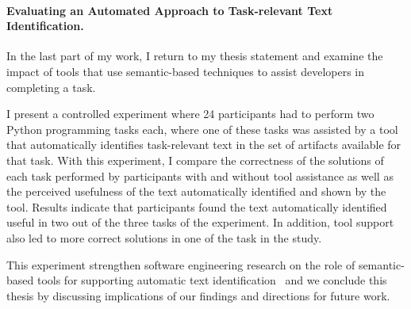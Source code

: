 \paragraph{\textbf{Evaluating an Automated Approach to Task-relevant Text Identification.}} 




In the last part of my work, I return to my thesis statement
and examine the impact of tools that use semantic-based techniques to assist developers in 
completing a task. 



I present a controlled experiment where 24 participants had to 
perform two Python programming tasks each, where one of these tasks 
was assisted by a tool that automatically identifies task-relevant text 
in the set of artifacts available for that task. 
With this experiment, I compare the correctness of the solutions of each task 
performed by participants with and without tool assistance
as well as the perceived usefulness of the text automatically identified and shown by the tool. 
Results indicate that participants found the text automatically identified
useful in two out of the three tasks of the experiment.
In addition, tool support also led to more correct solutions 
in one of the task in the study.





This experiment strengthen software engineering research on the 
role of semantic-based tools for supporting
automatic text identification~\cite{nadi2020, Xu2017,Lotufo2012}
and we conclude this thesis by discussing implications of our findings and 
directions for future work.




